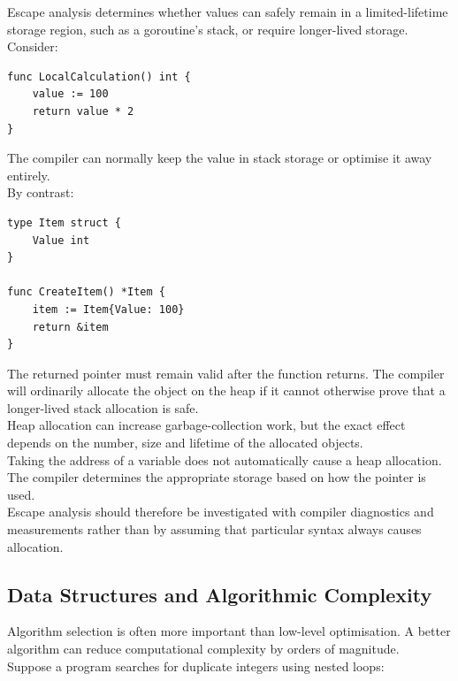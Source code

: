 Escape analysis determines whether values can safely remain in a limited-lifetime storage region, such as a goroutine's stack, or require longer-lived storage.\\

Consider:

\begin{lstlisting}
func LocalCalculation() int {
    value := 100
    return value * 2
}
\end{lstlisting}

The compiler can normally keep the value in stack storage or optimise it away entirely.\\

By contrast:

\begin{lstlisting}
type Item struct {
    Value int
}

func CreateItem() *Item {
    item := Item{Value: 100}
    return &item
}
\end{lstlisting}

The returned pointer must remain valid after the function returns. The compiler will ordinarily allocate the object on the heap if it cannot otherwise prove that a longer-lived stack allocation is safe.\\

Heap allocation can increase garbage-collection work, but the exact effect depends on the number, size and lifetime of the allocated objects.\\

Taking the address of a variable does not automatically cause a heap allocation. The compiler determines the appropriate storage based on how the pointer is used.\\

Escape analysis should therefore be investigated with compiler diagnostics and measurements rather than by assuming that particular syntax always causes allocation.

\subsection{Data Structures and Algorithmic Complexity}

Algorithm selection is often more important than low-level optimisation. A better algorithm can reduce computational complexity by orders of magnitude.\\

Suppose a program searches for duplicate integers using nested loops:

